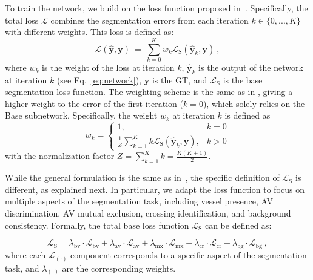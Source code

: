 \documentclass{article}
\begin{document}
To train the network, we build on the loss function proposed in~\cite{morano2024rrwnet}.
Specifically, the total loss $\mathcal{L}$ combines the segmentation errors from each iteration $k \in \{0,...,K\}$ with different weights.
This loss is defined as:
%
\begin{equation}\label{eq:loss}
    \mathcal{L}\left(\mathbf{\hat{y}},\mathbf{y}\right) ~=~ \sum_{k=0}^{K} w_k \mathcal{L}_\text{S}\left(\mathbf{\hat{y}}_k,\mathbf{y}\right) \ ,
\end{equation}
%
where
$w_k$ is the weight of the loss at iteration $k$,
$\mathbf{\hat{y}}_k$ is the output of the network at iteration $k$ (see Eq.~\ref{eq:network}),
$\mathbf{y}$ is the \gls{GT},
and $\mathcal{L}_\text{S}$ is the base segmentation loss function.
The weighting scheme is the same as in \cite{morano2024rrwnet}, giving a higher weight to the error of the first iteration ($k=0$), which solely relies on the Base subnetwork.
Specifically, the weight $w_k$ at iteration $k$ is defined as
%
\begin{equation}\label{eq:weights}
    w_k =
    \begin{cases}
        1, & k = 0 \\
        \frac{1}{Z} \sum_{k=1}^{K} k \mathcal{L}_\text{S}\left(\mathbf{\hat{y}}_k,\mathbf{y}\right), & k > 0
    \end{cases}
\end{equation}
%
with the normalization factor $Z = \sum_{k=1}^{K} k = \frac{K(K+1)}{2}$.

While the general formulation is the same as in~\cite{morano2024rrwnet}, the specific definition of $\mathcal{L}_\text{S}$ is different, as explained next.
In particular, we adapt the loss function to focus on multiple aspects of the segmentation task, including vessel presence, \gls{AV} discrimination, \gls{AV} mutual exclusion, crossing identification, and background consistency.
Formally, the total base loss function $\mathcal{L}_\text{S}$ can be defined as:

\begin{equation}
\mathcal{L}_\text{S} =
    \lambda_{\text{bv}} \cdot \mathcal{L}_{\text{bv}}
    + \lambda_{\text{av}} \cdot \mathcal{L}_{\text{av}}
    + \lambda_{\text{mx}} \cdot \mathcal{L}_{\text{mx}}
    + \lambda_{\text{cr}} \cdot \mathcal{L}_{\text{cr}}
    + \lambda_{\text{bg}} \cdot \mathcal{L}_{\text{bg}} \ ,
\end{equation}
where each $\mathcal{L}_{(\cdot)}$ component corresponds to a specific aspect of the segmentation task, and $\lambda_{(\cdot)}$ are the corresponding weights.
\end{document}
